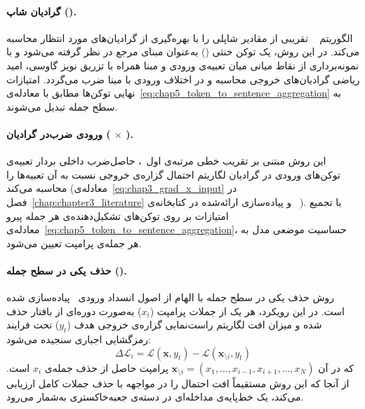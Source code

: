 \paragraph{گرادیان شاپ ().}\label{par:chap5_gradientshap_baseline}
الگوریتم ~\cite{lundberg2017unified, kokhlikyan2020captum, erion2021improving} تقریبی از مقادیر شاپلی را با بهره‌گیری از گرادیان‌های مورد انتظار محاسبه می‌کند. در این روش، یک توکن خنثی () به‌عنوان مبنای مرجع در نظر گرفته می‌شود و با نمونه‌برداری از نقاط میانی میان تعبیه‌ی ورودی و مبنا همراه با تزریق نویز گاوسی، امید ریاضی گرادیان‌های خروجی محاسبه و در اختلاف ورودی با مبنا ضرب می‌گردد. امتیازات نهایی توکن‌ها مطابق با معادله‌ی~\ref{eq:chap5_token_to_sentence_aggregation} به سطح جمله تبدیل می‌شوند.

\paragraph{ورودی ضرب‌در گرادیان ( $\times$ ).}\label{par:chap5_input_x_grad_baseline}
این روش مبتنی بر تقریب خطی مرتبه‌ی اول~\cite{li2016visualizing, simonyan2014deepinside}، حاصل‌ضرب داخلی بردار تعبیه‌ی توکن‌های ورودی در گرادیان لگاریتم احتمال گزاره‌ی خروجی نسبت به آن تعبیه‌ها را محاسبه می‌کند (معادله‌ی~\ref{eq:chap3_grad_x_input} در فصل~\ref{chap:chapter3_literature} و پیاده‌سازی ارائه‌شده در کتابخانه‌ی ~\cite{sarti2023inseq}). با تجمیع امتیازات بر روی توکن‌های تشکیل‌دهنده‌ی هر جمله پیرو معادله‌ی~\ref{eq:chap5_token_to_sentence_aggregation}، حساسیت موضعی مدل به هر جمله‌ی پرامپت تعیین می‌شود.

\paragraph{حذف یکی در سطح جمله ().}\label{par:chap5_sentence_loo_baseline}
روش حذف یکی در سطح جمله با الهام از اصول انسداد ورودی~\cite{li2017understanding, zeiler2014visualizing} پیاده‌سازی شده است. در این رویکرد، هر یک از جملات پرامپت ($x_i$) به‌صورت دوره‌ای از بافتار حذف شده و میزان افت لگاریتم راست‌نمایی گزاره‌ی خروجی هدف ($y_t$) تحت فرایند رمزگشایی اجباری سنجیده می‌شود:
\begin{equation}\label{eq:chap5_sentence_loo}
    \Delta \mathcal{L}_i = \mathcal{L}(\mathbf{x}, y_t) - \mathcal{L}(\mathbf{x}_{\setminus i}, y_t)
\end{equation}
که در آن $\mathbf{x}_{\setminus i} = (x_1, \dots, x_{i-1}, x_{i+1}, \dots, x_N)$ پرامپت حاصل از حذف جمله‌ی $x_i$ است. از آنجا که این روش مستقیماً افت احتمال را در مواجهه با حذف جملات کامل ارزیابی می‌کند، یک خط‌پایه‌ی مداخله‌ای در دسته‌ی جعبه‌خاکستری به‌شمار می‌رود.


